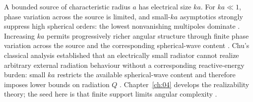 A bounded source of characteristic radius $a$ has electrical size $ka$. For $ka\ll 1$, phase variation across the source is limited, and small-$ka$ asymptotics strongly suppress high spherical orders: the lowest nonvanishing multipoles dominate \cite{stratton1941,chu1948}. Increasing $ka$ permits progressively richer angular structure through finite phase variation across the source and the corresponding spherical-wave content \cite{stratton1941}. Chu's classical analysis \cite{chu1948} established that an electrically small radiator cannot realize arbitrary external radiation behaviour without a corresponding reactive-energy burden: small $ka$ restricts the available spherical-wave content and therefore imposes lower bounds on radiation $Q$ \cite{chu1948,stratton1941}. Chapter~\ref{ch:04} develops the realizability theory; the seed here is that finite support limits angular complexity \cite{stratton1941,hansen1988}.


